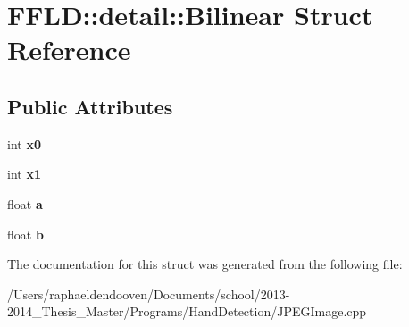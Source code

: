 \hypertarget{struct_f_f_l_d_1_1detail_1_1_bilinear}{\section{F\-F\-L\-D\-:\-:detail\-:\-:Bilinear Struct Reference}
\label{struct_f_f_l_d_1_1detail_1_1_bilinear}
}
\subsection*{Public Attributes}
\begin{DoxyCompactItemize}
\item 
\hypertarget{struct_f_f_l_d_1_1detail_1_1_bilinear_a31eb64fa55b8907bccef7fa7aa07b7ca}{int {\bfseries x0}}\label{struct_f_f_l_d_1_1detail_1_1_bilinear_a31eb64fa55b8907bccef7fa7aa07b7ca}

\item 
\hypertarget{struct_f_f_l_d_1_1detail_1_1_bilinear_acc4397ebea5708bd9d2fc9da6ebe7dc8}{int {\bfseries x1}}\label{struct_f_f_l_d_1_1detail_1_1_bilinear_acc4397ebea5708bd9d2fc9da6ebe7dc8}

\item 
\hypertarget{struct_f_f_l_d_1_1detail_1_1_bilinear_ab270f985cf37f5b1062369e6cb412990}{float {\bfseries a}}\label{struct_f_f_l_d_1_1detail_1_1_bilinear_ab270f985cf37f5b1062369e6cb412990}

\item 
\hypertarget{struct_f_f_l_d_1_1detail_1_1_bilinear_a1a4e803551275725eadf55d3281899e8}{float {\bfseries b}}\label{struct_f_f_l_d_1_1detail_1_1_bilinear_a1a4e803551275725eadf55d3281899e8}

\end{DoxyCompactItemize}


The documentation for this struct was generated from the following file\-:\begin{DoxyCompactItemize}
\item 
/\-Users/raphaeldendooven/\-Documents/school/2013-\/2014\-\_\-\-Thesis\-\_\-\-Master/\-Programs/\-Hand\-Detection/J\-P\-E\-G\-Image.\-cpp\end{DoxyCompactItemize}
